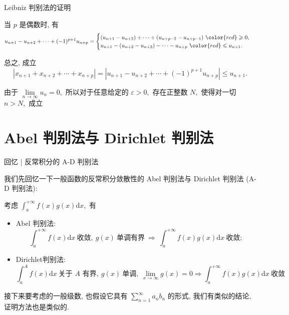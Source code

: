 
\begin{frame}{Leibniz 判别法的证明}

当 $p$ 是偶数时, 有
\begin{equation*}
u_{n+1} - u_{n+2} + \cdots + (-1)^{p+1} u_{n+p}
= \begin{cases}
(u_{n+1} - u_{n+2}) + \cdots + (u_{n+p-2} - u_{n+p-1}) ~ {\color{red} \geqslant 0}, \\
u_{n+1} - (u_{n+2} - u_{n+3}) - \cdots - u_{n+p} ~ {\color{red} \leqslant u_{n+1}}.
\end{cases}
\end{equation*}

\pause

总之, 成立
\[
\left\lvert x_{n+1} + x_{n+2} + \cdots + x_{n+p} \right\rvert = \left\lvert u_{n+1} - u_{n+2} + \cdots + (-1)^{p+1} u_{n+p} \right\rvert \leqslant u_{n+1}.
\]

由于 $\lim\limits_{n\to\infty} u_n = 0,$ 所以对于任意给定的 $\varepsilon > 0,$ 存在正整数 $N,$ 使得对一切 $n > N,$ 成立

\end{frame}


\section[A-D 判别法]{Abel 判别法与 Dirichlet 判别法}


\begin{frame}{回忆 | {\smaller[2] 反常积分的 A-D 判别法}}

我们先回忆一下一般函数的反常积分敛散性的 Abel 判别法与 Dirichlet 判别法 (A-D 判别法):

\pause

考虑 $\int_a^{+\infty} f(x)g(x) \mathrm{d} x,$ 有
\begin{itemize}
\item[(1)] Abel 判别法:
\[
\int_a^{+\infty} f(x) \mathrm{d} x ~ \text{收敛}, ~ g(x) ~ \text{单调有界} ~ \Longrightarrow ~ \int_a^{+\infty} f(x)g(x) \mathrm{d} x ~ \text{收敛};
\]
\item[(2)] Dirichlet判别法:
\[
\int_a^{A} f(x) \mathrm{d} x ~ \text{关于 $A$ 有界}, ~ g(x) ~ \text{单调}, ~ \lim\limits_{x\to\infty} g(x) = 0
\Longrightarrow \int_a^{+\infty} f(x)g(x) \mathrm{d} x ~ \text{收敛}
\]
\end{itemize}

\pause

接下来要考虑的一般级数, 也假设它具有 $\sum\limits_{n=1}^{\infty} a_n b_n$ 的形式, 我们有类似的结论, 证明方法也是类似的.

\end{frame}

